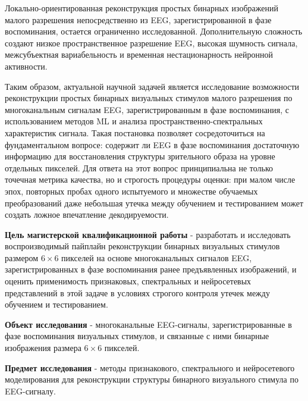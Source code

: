 Локально-ориентированная реконструкция простых бинарных изображений малого разрешения непосредственно из EEG, 
зарегистрированной в фазе воспоминания, остается ограниченно исследованной. 
Дополнительную сложность создают низкое пространственное разрешение EEG, высокая шумность сигнала, межсубъектная вариабельность и временная нестационарность нейронной активности. 

Таким образом, актуальной научной задачей является исследование возможности реконструкции простых бинарных визуальных стимулов малого разрешения по многоканальным сигналам EEG, 
зарегистрированным в фазе воспоминания, с использованием методов ML и анализа пространственно-спектральных характеристик сигнала. 
Такая постановка позволяет сосредоточиться на фундаментальном вопросе: содержит ли EEG в фазе воспоминания достаточную информацию для восстановления структуры зрительного образа на уровне отдельных пикселей. 
Для ответа на этот вопрос принципиальна не только точечная метрика качества, но и строгость процедуры оценки: при малом числе эпох, повторных пробах одного испытуемого и множестве обучаемых преобразований даже небольшая утечка между обучением и тестированием может создать ложное впечатление декодируемости.


\newpage

\textbf{Цель магистерской квалификационной работы} - разработать и исследовать воспроизводимый пайплайн реконструкции бинарных визуальных стимулов размером $6\times6$ пикселей на основе многоканальных сигналов EEG, зарегистрированных в фазе воспоминания ранее предъявленных изображений, и оценить применимость признаковых, спектральных и нейросетевых представлений в этой задаче в условиях строгого контроля утечек между обучением и тестированием.

\textbf{Объект исследования} - многоканальные EEG-сигналы, зарегистрированные в фазе воспоминания визуальных стимулов, и связанные с ними бинарные изображения размера $6\times6$ пикселей.

\textbf{Предмет исследования} - методы признакового, спектрального и нейросетевого моделирования для реконструкции структуры бинарного визуального стимула по EEG-сигналу.

